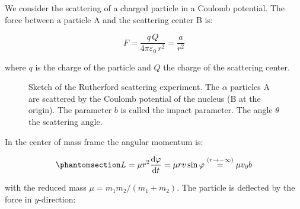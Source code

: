 \documentclass[
  a4paper,
]{book}
\begin{document}
\begin{tcolorbox}[enhanced jigsaw, coltitle=black, title=\textcolor{quarto-callout-note-color}{\faInfo}\hspace{0.5em}{Rutherford scattering}, colframe=quarto-callout-note-color-frame, toprule=.15mm, opacitybacktitle=0.6, left=2mm, opacityback=0, breakable, toptitle=1mm, bottomtitle=1mm, leftrule=.75mm, arc=.35mm, titlerule=0mm, colbacktitle=quarto-callout-note-color!10!white, rightrule=.15mm, bottomrule=.15mm, colback=white]

We consider the scattering of a charged particle in a Coulomb potential.
The force between a particle A and the scattering center B is:

\[
F = \frac{q\,Q}{4\pi\varepsilon_0\,r^2} = \frac{a}{r^2}
\]

where \(q\) is the charge of the particle and \(Q\) the charge of the
scattering center.

\begin{figure}[H]


\caption{\label{fig-rutherford}Sketch of the Rutherford scattering
experiment. The \(\alpha\) particles A are scattered by the Coulomb
potential of the nucleus (B at the origin). The parameter \(b\) is
called the impact parameter. The angle \(\theta\) the scattering angle.}

\end{figure}%

In the center of mass frame the angular momentum is:

\begin{equation}\phantomsection\label{eq-angular-momentum}{
L =\mu r^2 \frac{\mathrm d \varphi}{\mathrm dt} =  \mu r v \sin\varphi\stackrel{(r\rightarrow-\infty)}{=} \mu v_0 b
}\end{equation}

with the reduced mass \(\mu=m_1 m_2/(m_1+m_2)\). The particle is
deflected by the force in \(y\)-direction:


\end{tcolorbox}
\end{document}
